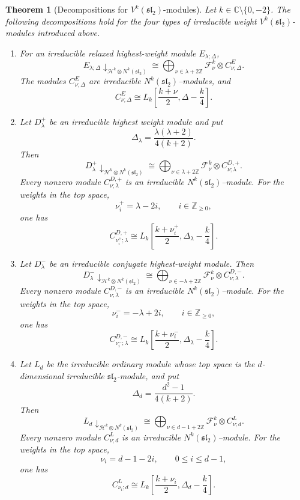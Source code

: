 \documentclass[11 pt]{amsart}
\newtheorem{theorem}{Theorem}
\theoremstyle{definition}
\theoremstyle{plain}
\begin{document}
\begin{theorem}[Decompositions for $V^k(\mathfrak{sl}_2)$-modules]
\label{thm:universal-affine-decompositions}
Let $k\in\mathbb C\setminus\{0,-2\}$.  The following decompositions hold for
the four types of irreducible weight $V^k(\mathfrak{sl}_2)$-modules
introduced above.
\begin{enumerate}[label=\textup{(\roman*)}]
\item For an irreducible relaxed highest-weight module $E_{\lambda;\Delta}$,
\[
E_{\lambda;\Delta}\downarrow_{\mathcal H^k\otimes N^k(\mathfrak{sl}_2)}
\cong
\bigoplus_{\nu\in\lambda+2\mathbb Z}
\mathcal F^k_\nu\otimes C^E_{\nu;\Delta}.
\]
The modules $C^E_{\nu;\Delta}$ are irreducible
$N^k(\mathfrak{sl}_2)$--modules, and
\[
C^E_{\nu;\Delta}
\cong
L_k\left[\frac{k+\nu}{2},\Delta-\frac{k}{4}\right].
\]

\item Let $D^+_\lambda$ be an irreducible highest weight module and put
\[
\Delta_\lambda=\frac{\lambda(\lambda+2)}{4(k+2)}.
\]
Then
\[
D^+_\lambda\downarrow_{\mathcal H^k\otimes N^k(\mathfrak{sl}_2)}
\cong
\bigoplus_{\nu\in\lambda+2\mathbb Z}
\mathcal F^k_\nu\otimes C^{D,+}_{\nu;\lambda}.
\]
Every nonzero module $C^{D,+}_{\nu;\lambda}$ is an
irreducible $N^k(\mathfrak{sl}_2)$--module.
For the weights in the top space,
\[
\nu_i^+=\lambda-2i,
\qquad i\in\mathbb Z_{\geq0},
\]
one has
\[
C^{D,+}_{\nu_i^+;\lambda}
\cong
L_k\left[\frac{k+\nu_i^+}{2},
\Delta_\lambda-\frac{k}{4}\right].
\]

\item Let $D^-_\lambda$ be an irreducible conjugate highest-weight module.
Then
\[
D^-_\lambda\downarrow_{\mathcal H^k\otimes N^k(\mathfrak{sl}_2)}
\cong
\bigoplus_{\nu\in-\lambda+2\mathbb Z}
\mathcal F^k_\nu\otimes C^{D,-}_{\nu;\lambda}.
\]
Every nonzero module $C^{D,-}_{\nu;\lambda}$ is an
irreducible $N^k(\mathfrak{sl}_2)$--module.
For the weights in the top space,
\[
\nu_i^-=-\lambda+2i,
\qquad i\in\mathbb Z_{\geq0},
\]
one has
\[
C^{D,-}_{\nu_i^-;\lambda}
\cong
L_k\left[\frac{k+\nu_i^-}{2},
\Delta_\lambda-\frac{k}{4}\right].
\]

\item Let $L_d$ be the irreducible ordinary module whose top space is the
$d$-dimensional irreducible $\mathfrak{sl}_2$-module, and put
\[
\Delta_d=\frac{d^2-1}{4(k+2)}.
\]
Then
\[
L_d\downarrow_{\mathcal H^k\otimes N^k(\mathfrak{sl}_2)}
\cong
\bigoplus_{\nu\in d-1+2\mathbb Z}
\mathcal F^k_\nu\otimes C^L_{\nu;d}.
\]
Every nonzero module $C^L_{\nu;d}$ is an irreducible
$N^k(\mathfrak{sl}_2)$--module. For the weights in the top space,
\[
\nu_i=d-1-2i,
\qquad 0\leq i\leq d-1,
\]
one has
\[
C^L_{\nu_i;d}
\cong
L_k\left[\frac{k+\nu_i}{2},
\Delta_d-\frac{k}{4}\right].
\]
\end{enumerate}


\end{theorem}
\end{document}
